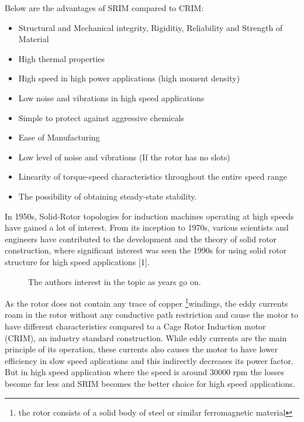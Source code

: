 Below are the advantages of SRIM compared to CRIM:
%
\begin{itemize}[itemsep=0pt]
	\item Structural and Mechanical integrity, Rigiditiy, Reliability and Strength of
	      Material
	\item High thermal properties
	\item High speed in high power applications (high moment density)
	\item Low noise and vibrations in high speed applications
	\item Simple to protect against aggressive chemicals
	\item Ease of Manufacturing
	\item Low level of noise and vibrations (If the rotor has no slots)
	\item Linearity of torque-speed characteristics throughout the entire speed range
	\item The possibility of obtaining steady-state stability.
\end{itemize}

In 1950s, Solid-Rotor topologies for induction machines operating at high speeds
have gained a lot of interest. From its inception to 1970s, various scientists and engineers
have contributed to the development and the theory of solid rotor construction, where significant
interest was seen the 1990s for using solid rotor structure for high speed applications [1].

\begin{figure}[!t]
	\caption{The authors interest in the topic as years go on.}
\end{figure}

As the rotor does not contain any trace of copper \footnote{the rotor
	consists of a solid body of steel or similar ferromagnetic material}{windings}, the eddy currents
roam in the rotor without any conductive path restriction and cause the motor to
have different characteristics compared to a Cage Rotor Induction motor (CRIM), an industry standard
construction.
While eddy currents are the main principle of its operation, these currents also causes
the motor to have lower efficiency in slow speed aplications and this indirectly
decreases its power factor. But in high speed application where the speed is
around 30000 rpm the losses become far less and SRIM becomes the better choice for high speed
applications.

